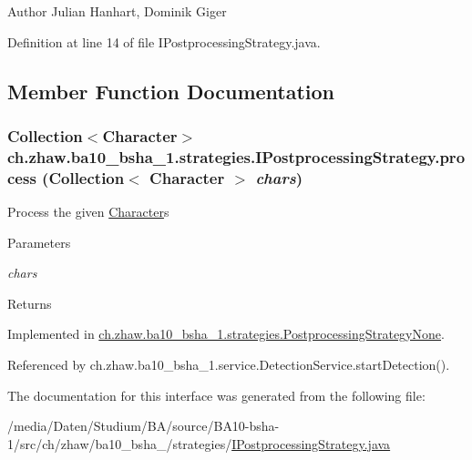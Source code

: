 \begin{DoxyAuthor}{Author}
Julian Hanhart, Dominik Giger 
\end{DoxyAuthor}


Definition at line 14 of file IPostprocessingStrategy.java.

\subsection{Member Function Documentation}
\hypertarget{interfacech_1_1zhaw_1_1ba10__bsha__1_1_1strategies_1_1IPostprocessingStrategy_a0bb435d4c5cb8ce3b3909ad81961d912}{
\subsubsection[{process}]{\setlength{\rightskip}{0pt plus 5cm}Collection$<${\bf Character}$>$ ch.zhaw.ba10\_\-bsha\_\-1.strategies.IPostprocessingStrategy.process (Collection$<$ {\bf Character} $>$ {\em chars})}}
\label{interfacech_1_1zhaw_1_1ba10__bsha__1_1_1strategies_1_1IPostprocessingStrategy_a0bb435d4c5cb8ce3b3909ad81961d912}
Process the given \hyperlink{classch_1_1zhaw_1_1ba10__bsha__1_1_1Character}{Character}s


\begin{DoxyParams}{Parameters}
\item[{\em chars}]\end{DoxyParams}
\begin{DoxyReturn}{Returns}

\end{DoxyReturn}


Implemented in \hyperlink{classch_1_1zhaw_1_1ba10__bsha__1_1_1strategies_1_1PostprocessingStrategyNone_af9183ec4f0802402cde7f97f746c7874}{ch.zhaw.ba10\_\-bsha\_\-1.strategies.PostprocessingStrategyNone}.

Referenced by ch.zhaw.ba10\_\-bsha\_\-1.service.DetectionService.startDetection().

The documentation for this interface was generated from the following file:\begin{DoxyCompactItemize}
\item 
/media/Daten/Studium/BA/source/BA10-\/bsha-\/1/src/ch/zhaw/ba10\_\-bsha\_/strategies/\hyperlink{IPostprocessingStrategy_8java}{IPostprocessingStrategy.java}\end{DoxyCompactItemize}
